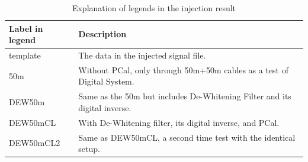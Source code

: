 \begin{table}[hbt!]
\centering
\begin{tabular}{ll}
\hline
Label in legend  & Description        \\
\hline
template    & The data in the injected signal file.\\
50m         & Without PCal, only through 50m+50m cables as a test of Digital System.\\
DEW50m      & Same as the 50m but includes De-Whitening Filter and its digital inverse.   \\
DEW50mCL    & With De-Whitening filter, its digital inverse, and PCal.   \\
DEW50mCL2   & Same as DEW50mCL, a second time test with the identical setup.    \\
\hline
\end{tabular}
\caption{Explanation of legends in the injection result}
\label{tab:injlegend}
\end{table}



